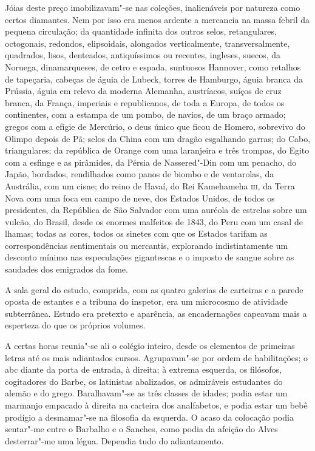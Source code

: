Jóias deste preço
imobilizavam"-se nas coleções, inalienáveis por natureza como certos
diamantes. Nem por isso era menos ardente a mercancia na massa febril
da pequena circulação; da quantidade infinita dos outros selos,
retangulares, octogonais, redondos, elipsoidais, alongados
verticalmente, transversalmente, quadrados, lisos, denteados,
antiquíssimos ou recentes, ingleses, suecos, da Noruega, dinamarqueses,
de cetro e espada, suntuosos Hannover, como retalhos de tapeçaria,
cabeças de águia de Lubeck, torres de Hamburgo, águia branca da
Prússia, águia em relevo da moderna Alemanha, austríacos, suíços de
cruz branca, da França, imperiais e republicanos, de toda a Europa, de
todos os continentes, com a estampa de um pombo, de navios, de um braço
armado; gregos com a efígie de Mercúrio, o deus único que ficou de
Homero, sobrevivo do Olimpo depois de Pã; selos da China com um dragão
esgalhando garras; do Cabo, triangulares; da república de Orange com
uma laranjeira e três trompas, do Egito com a esfinge e as pirâmides,
da Pérsia de Nassered"-Din com um penacho, do Japão, bordados,
rendilhados como panos de biombo e de ventarolas, da Austrália, com um
cisne; do reino de Havaí, do Rei Kamehameha \textsc{iii}, da Terra Nova com uma
foca em campo de neve, dos Estados Unidos, de todos os presidentes, da
República de São Salvador com uma auréola de estrelas sobre um vulcão,
do Brasil, desde os enormes malfeitos de 1843, do Peru com um casal de
lhamas; todas as cores, todos os sinetes com que os Estados tarifam as
correspondências sentimentais ou mercantis, explorando indistintamente
um desconto mínimo nas especulações gigantescas e o imposto de sangue
sobre as saudades dos emigrados da fome. 

A sala geral do estudo,
comprida, com as quatro galerias de carteiras e a parede oposta de
estantes e a tribuna do inspetor, era um microcosmo de atividade
subterrânea. Estudo era pretexto e aparência, as encadernações capeavam
mais a esperteza do que os próprios volumes. 

A certas horas reunia"-se
ali o colégio inteiro, desde os elementos de primeiras letras até os
mais adiantados cursos. Agrupavam"-se por ordem de habilitações; o abc
diante da porta de entrada, à direita; à extrema esquerda, os
filósofos, cogitadores do Barbe, os latinistas abalizados, os
admiráveis estudantes do alemão e do grego. Baralhavam"-se as três
classes de idades; podia estar um marmanjo empacado à direita na
carteira dos analfabetos, e podia estar um bebê prodígio a
desmamar"-se na filosofia da esquerda. O acaso da colocação podia
sentar"-me entre o Barbalho e o Sanches, como podia da afeição do
Alves desterrar"-me uma légua. Dependia tudo do adiantamento. 

